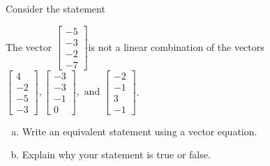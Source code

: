
\begin{exerciseStatement}


Consider the statement 
\begin{center}\begin{minipage}{0.8\textwidth}
 The vector \( \left[\begin{array}{c}
-5 \\
-3 \\
-2 \\
-7
\end{array}\right] \)is not a linear combination of the vectors \( \left[\begin{array}{c}
4 \\
-2 \\
-5 \\
-3
\end{array}\right] , \left[\begin{array}{c}
-3 \\
-3 \\
-1 \\
0
\end{array}\right] , \text{ and } \left[\begin{array}{c}
-2 \\
-1 \\
3 \\
-1
\end{array}\right] \). 
\end{minipage}\end{center}
    


\begin{enumerate}[(a)]
\item  Write an equivalent statement using a vector equation.
\item  Explain why your statement is true or false.
\end{enumerate}
    
\end{exerciseStatement}
    
